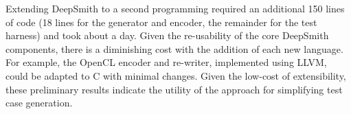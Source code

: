 Extending DeepSmith to a second programming required an additional 150 lines of code (18 lines for the generator and encoder, the remainder for the test harness) and took about a day. Given the re-usability of the core DeepSmith components, there is a diminishing cost with the addition of each new language. For example, the OpenCL encoder and re-writer, implemented using LLVM, could be adapted to C with minimal changes. Given the low-cost of extensibility, these preliminary results indicate the utility of the approach for simplifying test case generation.
